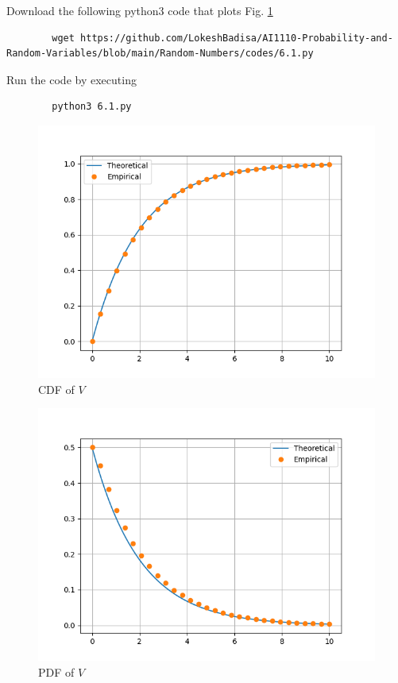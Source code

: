 \documentclass[journal,12pt,twocolumn]{IEEEtran}
\numberwithin{equation}{section}
\renewcommand\thesection{\arabic{section}}
\begin{document}
\begin{enumerate}[label=\thesection.\arabic*,ref=\thesection.\theenumi]
	Download the following python3 code that plots Fig. \ref{fig-6.1} 
	\begin{lstlisting}
		wget https://github.com/LokeshBadisa/AI1110-Probability-and-Random-Variables/blob/main/Random-Numbers/codes/6.1.py
	\end{lstlisting}
	Run the code by executing
	\begin{lstlisting}
		python3 6.1.py
	\end{lstlisting}
	\begin{figure}
		\centering
		\includegraphics[width=\columnwidth]{./figs/6.1.png}
		\caption{CDF of $V$}
		\label{fig-6.1}
	\end{figure}
	\begin{figure}
		\centering
		\includegraphics[width=\columnwidth]{./figs/6.2.png}
		\caption{PDF of $V$}
		\label{fig-6.2}
	\end{figure}
	

\end{enumerate}
\end{document}
